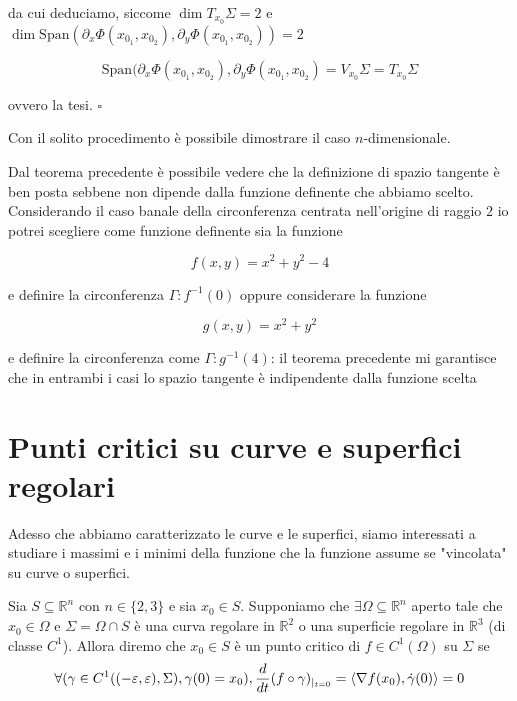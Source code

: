 da cui deduciamo, siccome $\dim{T_{x_0} \Sigma} = 2$ e $\dim{\text{Span}(\partial_{x} \Phi(x_{0_1}, x_{0_2}), \partial_y \Phi(x_{0_1}, x_{0_2}))} = 2$

$$
	\text{Span}(\partial_x \Phi(x_{0_1}, x_{0_2}), \partial_y \Phi(x_{0_1}, x_{0_2}) = V_{x_0} \Sigma = T_{x_0} \Sigma
$$

ovvero la tesi.
\hfill $\square$

\begin{remark}
Con il solito procedimento è possibile dimostrare il caso $n$-dimensionale.
\end{remark}

\begin{remark}
Dal teorema precedente è possibile vedere che la definizione di spazio tangente è ben posta sebbene non dipende dalla funzione definente che abbiamo scelto. Considerando il caso banale della circonferenza centrata nell'origine di raggio $2$ io potrei scegliere come funzione definente sia la funzione

$$
f(x, y) = x^2 + y^2 - 4
$$

e definire la circonferenza $\Gamma: f^{-1}(0)$ oppure considerare la funzione

$$
g(x, y) = x^2 + y^2
$$

e definire la circonferenza come $\Gamma: g^{-1}(4)$: il teorema precedente mi garantisce che in entrambi i casi lo spazio tangente è indipendente dalla funzione scelta
\end{remark}

\vspace{0.5cm}
\section{Punti critici su curve e superfici regolari}
Adesso che abbiamo caratterizzato le curve e le superfici, siamo interessati a studiare i massimi e i minimi della funzione che la funzione assume se "vincolata" su curve o superfici. 

\vspace{0.5cm}
\begin{definition}[\textcolor{blue}{Punti critici su curve/superfici}]
Sia $S \subseteq \mathbb{R}^n$ con $n \in \{ 2, 3 \}$ e sia $x_0 \in S$. Supponiamo che $\exists \Omega \subseteq \mathbb{R}^n$ aperto tale che $x_0 \in \Omega$ e $\Sigma = \Omega \cap S$ è una curva regolare in $\mathbb{R}^2$ o una superficie regolare in $\mathbb{R}^3$ (di classe $C^1$). Allora diremo che $x_0 \in S$ è un punto critico di $f \in C^1(\Omega)$ su $\Sigma$ se
$$
\forall (\gamma \in C^1 ((-\varepsilon, \varepsilon), \Sigma), \gamma(0) = x_0), \frac{d}{dt} (f \circ \gamma)_{|_{t=0}} = \langle \nabla f(x_0), \dot{\gamma}(0) \rangle = 0
$$
\end{definition}

